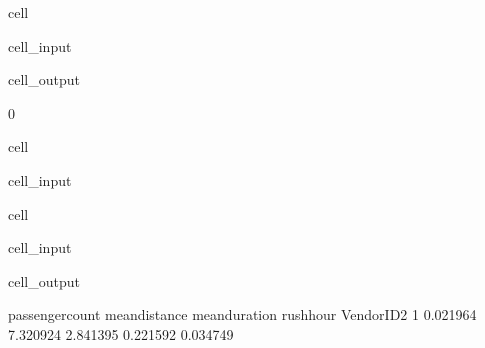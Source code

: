 \documentclass[letterpaper,10pt,english]{sphinxmanual}
\begin{document}
\begin{sphinxuseclass}{cell}
\begin{sphinxuseclass}{cell_input}
\begin{sphinxVerbatim}[commandchars=\\\{\}]
\end{sphinxVerbatim}

\end{sphinxuseclass}
\begin{sphinxuseclass}{cell_output}
\begin{sphinxVerbatim}[commandchars=\\\{\}]
0
\end{sphinxVerbatim}

\end{sphinxuseclass}
\end{sphinxuseclass}
\begin{sphinxuseclass}{cell}
\begin{sphinxuseclass}{cell_input}
\begin{sphinxVerbatim}[commandchars=\\\{\}]
\PYG{p}{[}\PYG{p}{]}  
\end{sphinxVerbatim}

\end{sphinxuseclass}
\end{sphinxuseclass}
\begin{sphinxuseclass}{cell}
\begin{sphinxuseclass}{cell_input}
\begin{sphinxVerbatim}[commandchars=\\\{\}]
\end{sphinxVerbatim}

\end{sphinxuseclass}
\begin{sphinxuseclass}{cell_output}
\begin{sphinxVerbatim}[commandchars=\\\{\}]
   passenger\PYGZus{}count  mean\PYGZus{}distance  mean\PYGZus{}duration  rush\PYGZus{}hour  VendorID\PYGZus{}2
1         0.021964       7.320924       2.841395   0.221592    0.034749
\end{sphinxVerbatim}

\end{sphinxuseclass}
\end{sphinxuseclass}
\sphinxstepscope
\end{document}
